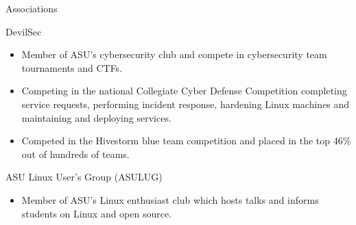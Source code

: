 \documentclass{article}
\newlength{\tabin}
\newlength{\secsep}
\newcommand{\lineunder}{\vspace*{-8pt} \\ \hspace*{-6pt} \hrulefill \\ \vspace*{-15pt}}
\newenvironment{tabbedsection}[1]{
  \begin{list}{}{
      \setlength{\itemsep}{0pt}
      \setlength{\labelsep}{0pt}
      \setlength{\labelwidth}{0pt}
      \setlength{\leftmargin}{\tabin}
      \setlength{\rightmargin}{\tabin}
      \setlength{\listparindent}{0pt}
      \setlength{\parsep}{0pt}
      \setlength{\parskip}{0pt}
      \setlength{\partopsep}{0pt}
      \setlength{\topsep}{#1}
    }
  \item[]
}{\end{list}}
\newenvironment{resume_section}[1]{
  \filbreak
  \vspace{2\secsep}
  \textsc{\color{blue}\large#1}
  \lineunder
  \begin{tabbedsection}{\secsep}
}{\end{tabbedsection}}
\newenvironment{resume_subsection}[2][]{
  \textbf{\color{BlueViolet}#2} \hfill {\normalsize #1} \hspace{-5em} 
  \begin{tabbedsection}{0.5\secsep}
}{\end{tabbedsection}}
\newenvironment{subitems}{
  \renewcommand{\labelitemi}{-}
  \begin{itemize}
      \setlength{\labelsep}{1em}
}{\end{itemize}}
\begin{document}
\vspace{2\secsep}

\begin{resume_section}{Associations}
  	\begin{resume_subsection}{DevilSec}
        \begin{subitems}
		    \item Member of ASU's cybersecurity club and compete in cybersecurity team tournaments and CTFs.
            \item Competing in the national Collegiate Cyber Defense Competition completing service requests, performing incident response, hardening Linux machines and maintaining and deploying services.
            \item Competed in the Hivestorm blue team competition and placed in the top 46\% out of hundreds of teams.
        \end{subitems}
  	\end{resume_subsection}
  	\vspace{2\secsep}
  	\begin{resume_subsection}{ASU Linux User's Group (ASULUG)}
        \begin{subitems}
            \item Member of ASU's Linux enthusiast club which hosts talks and informs students on Linux and open source. 
        \end{subitems}
  	\end{resume_subsection}
\end{resume_section}
\end{document}
